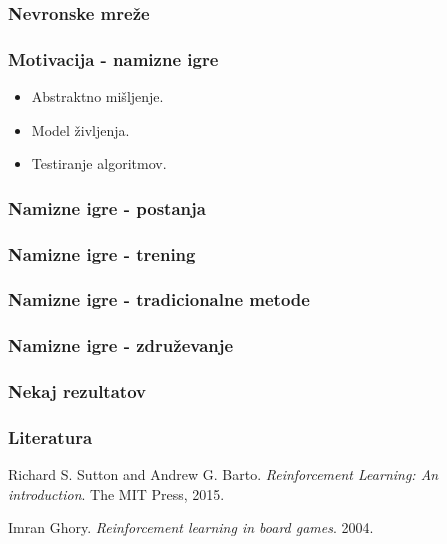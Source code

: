 \documentclass{beamer}    %
\begin{document}
\begin{frame}
    \frametitle{Nevronske mreže}
\end{frame}


\begin{frame}
    \frametitle{Motivacija - namizne igre}
    \begin{itemize}
        \item Abstraktno mišljenje.
        \item Model življenja.
        \item Testiranje algoritmov.
    \end{itemize}
\end{frame}


\begin{frame}
    \frametitle{Namizne igre - postanja}
\end{frame}


\begin{frame}
    \frametitle{Namizne igre - trening}
\end{frame}


\begin{frame}
    \frametitle{Namizne igre - tradicionalne metode}
\end{frame}


\begin{frame}
    \frametitle{Namizne igre - združevanje}
\end{frame}


\begin{frame}
    \frametitle{Nekaj rezultatov}
\end{frame}


\begin{frame}
    \frametitle{Literatura}
    \begin{thebibliography}{9}
        Richard S. Sutton and Andrew G. Barto. 
    \textit{Reinforcement Learning: An introduction}.
    The MIT Press, 
    2015.

    \medskip
    \medskip

    Imran Ghory.
    \textit{Reinforcement learning in board games}.
    2004.

    \end{thebibliography}
\end{frame}
\end{document}
